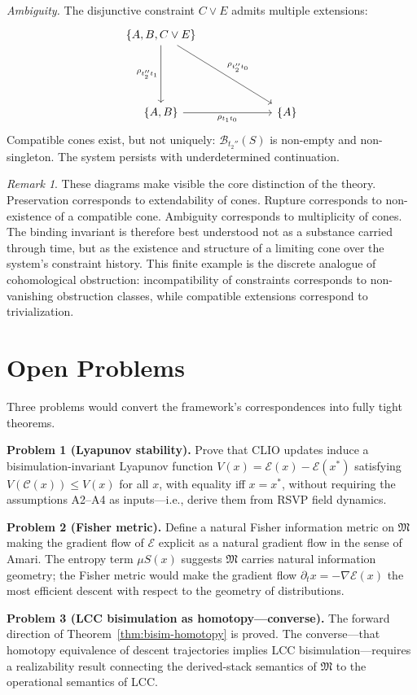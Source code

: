 \documentclass[11pt, letterpaper]{article}
\theoremstyle{plain}
\theoremstyle{definition}
\theoremstyle{remark}
\newtheorem{remark}[theorem]{Remark}
\newcommand{\BI}{\mathcal{B}}
\newcommand{\CC}{\mathcal{C}}
\newcommand{\MM}{\mathfrak{M}}
\newcommand{\EE}{\mathcal{E}}
\newcommand{\grad}{\nabla}
\begin{document}
\medskip
\noindent\textit{Ambiguity.} The disjunctive constraint $C \vee E$ admits multiple extensions:
\[
\begin{tikzcd}[column sep=2.2cm, row sep=1.8cm]
  \{A,B,C\vee E\}
    \arrow[d, "\rho_{t_2'' t_1}"']
    \arrow[dr, "\rho_{t_2'' t_0}"]
  & \\
  \{A,B\}
    \arrow[r, "\rho_{t_1 t_0}"']
  & \{A\}
\end{tikzcd}
\]
Compatible cones exist, but not uniquely: $\BI_{t_2''}(S)$ is non-empty and
non-singleton. The system persists with underdetermined continuation.

\begin{remark}
These diagrams make visible the core distinction of the theory. Preservation
corresponds to extendability of cones. Rupture corresponds to non-existence of a
compatible cone. Ambiguity corresponds to multiplicity of cones. The binding invariant
is therefore best understood not as a substance carried through time, but as the
existence and structure of a limiting cone over the system's constraint history. This
finite example is the discrete analogue of cohomological obstruction: incompatibility
of constraints corresponds to non-vanishing obstruction classes, while compatible
extensions correspond to trivialization.
\end{remark}

\section{Open Problems}

Three problems would convert the framework's correspondences into fully tight theorems.

\textbf{Problem 1 (Lyapunov stability).} Prove that CLIO updates induce a
bisimulation-invariant Lyapunov function $V(x) = \EE(x) - \EE(x^*)$ satisfying
$V(\CC(x)) \leq V(x)$ for all $x$, with equality iff $x = x^*$, without requiring
the assumptions A2--A4 as inputs---i.e., derive them from RSVP field dynamics.

\textbf{Problem 2 (Fisher metric).} Define a natural Fisher information metric on
$\MM$ making the gradient flow of $\EE$ explicit as a natural gradient flow in the
sense of Amari. The entropy term $\mu S(x)$ suggests $\MM$ carries natural information
geometry; the Fisher metric would make the gradient flow $\partial_t x = -\grad\EE(x)$
the most efficient descent with respect to the geometry of distributions.

\textbf{Problem 3 (LCC bisimulation as homotopy---converse).} The forward direction of
Theorem~\ref{thm:bisim-homotopy} is proved. The converse---that homotopy equivalence
of descent trajectories implies LCC bisimulation---requires a realizability result
connecting the derived-stack semantics of $\MM$ to the operational semantics of LCC.
\end{document}
